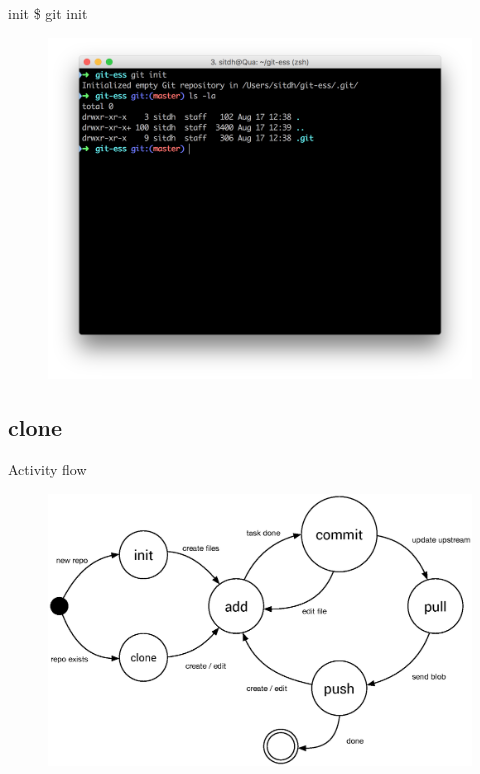 \documentclass{beamer}
\begin{document}
\begin{frame}{init}
    \Large{\$ git init}
    \begin{figure}
        \center
        \includegraphics[width=.9\textwidth]{git-init}
        \label{fig:git-init}
    \end{figure}
\end{frame}

\subsection[clone]{clone}
\begin{frame}{Activity flow}
    \begin{figure}
        \center
        \includegraphics[width=.9\textwidth]{git-command-flow}
        \label{fig:git-command-flow-1}
    \end{figure}
\end{frame}
\end{document}
